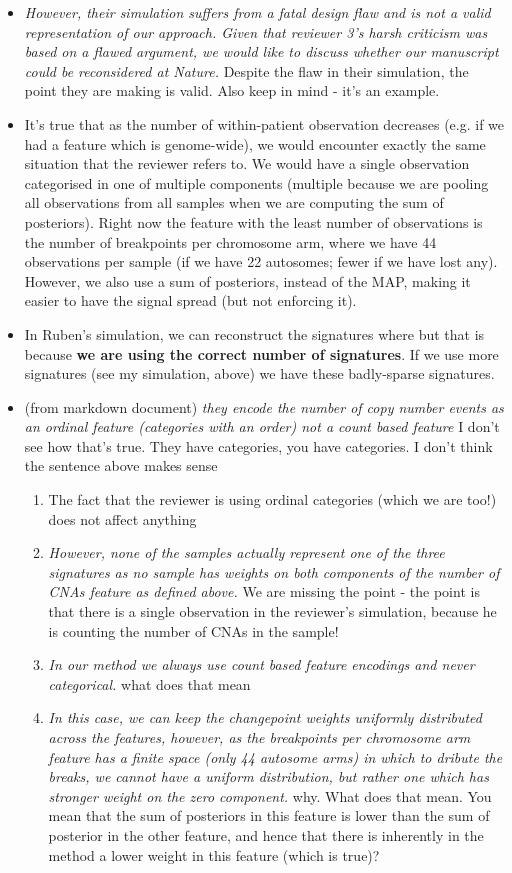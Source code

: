 \documentclass[11pt,a4paper,roman]{article}
\begin{document}
\begin{itemize}
\item \emph{However, their simulation suffers from a fatal design flaw and is not a valid representation of our approach. Given that reviewer 3’s harsh criticism was based on a flawed argument, we would like to discuss whether our manuscript could be reconsidered at Nature.} Despite the flaw in their simulation, the point they are making is valid. Also keep in mind - it's an example.
\item It's true that as the number of within-patient observation decreases (e.g. if we had a feature which is genome-wide), we would encounter exactly the same situation that the reviewer refers to. We would have a single observation categorised in one of multiple components (multiple because we are pooling all observations from all samples when we are computing the sum of posteriors). Right now the feature with the least number of observations is the number of breakpoints per chromosome arm, where we have 44 observations per sample (if we have 22 autosomes; fewer if we have lost any). However, we also use a sum of posteriors, instead of the MAP, making it easier to have the signal spread (but not enforcing it).
\item In Ruben's simulation, we can reconstruct the signatures where but that is because \textbf{we are using the correct number of signatures}. If we use more signatures (see my simulation, above) we have these badly-sparse signatures.
\item (from markdown document) \emph{they encode the number of copy number events as an ordinal feature (categories with an order) not a count based feature} I don't see how that's true. They have categories, you have categories. I don't think the sentence above makes sense
\begin{enumerate}
\item The fact that the reviewer is using ordinal categories (which we are too!) does not affect anything
\item \emph{However, none of the samples actually represent one of the three signatures as no sample has weights on both components of the number of CNAs feature as defined above.} We are missing the point - the point is that there is a single observation in the reviewer's simulation, because he is counting the number of CNAs in the sample!
\item \emph{In our method we always use count based feature encodings and never categorical.} what does that mean
\item \emph{In this case, we can keep the changepoint weights uniformly distributed across the features, however, as the breakpoints per chromosome arm feature has a finite space (only 44 autosome arms) in which to dribute the breaks, we cannot have a uniform distribution, but rather one which has stronger weight on the zero component.} why. What does that mean. You mean that the sum of posteriors in this feature is lower than the sum of posterior in the other feature, and hence that there is inherently in the method a lower weight in this feature (which is true)?
\end{enumerate}
\end{itemize}
\end{document}
